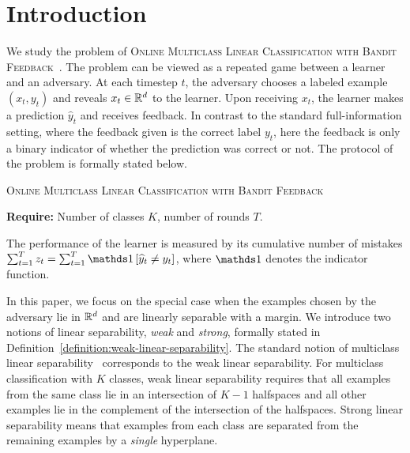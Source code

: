 \section{Introduction}
\label{section:introduction}

We study the problem of \textsc{Online Multiclass Linear Classification with
Bandit Feedback}~\citep{Kakade-Shalev-Shwartz-Tewari-2008}. The problem can be
viewed as a repeated game between a learner and an adversary. At each
timestep $t$, the adversary chooses a labeled example $(x_t, y_t)$ and reveals $x_t\in \mathbb{R}^d$ to the learner.  
Upon receiving $x_t$, the learner makes a prediction $\widehat{y}_t$ and receives feedback. 
In contrast to the
standard full-information setting, where the feedback given is the correct label
$y_t$, here the feedback is only a binary indicator of whether the prediction
was correct or not. The protocol of the problem is formally stated below.

\begin{protocol}[h]
\caption{\textsc{Online Multiclass Linear Classification with Bandit Feedback}
\label{algorithm:game-protocol}}
\textbf{Require:} Number of classes $K$, number of rounds $T$.\\

\end{protocol}

The performance of the learner is measured by its cumulative number of
mistakes $\sum_{t=1}^T z_t = \sum_{t=1}^T \indicator{\widehat y_t \neq y_t}$,
where $\one$ denotes the indicator function.

In this paper, we focus on the special case when the examples chosen by the
adversary lie in $\mathbb{R}^d$ and are linearly separable with a margin. We introduce
two notions of linear separability, \emph{weak} and \emph{strong}, formally
stated in
Definition~\ref{definition:weak-linear-separability}.
The standard notion of multiclass linear
separability~\citep{Crammer-Singer-2003} corresponds to the weak linear
separability. %
For multiclass classification with $K$ classes, weak linear
separability requires that all examples from the same class lie in an intersection of $K-1$ halfspaces and all other examples lie in the complement of
the intersection of the halfspaces. Strong linear separability means that
examples from each class are separated from the remaining examples by a
\emph{single} hyperplane.


